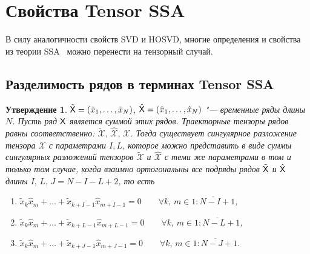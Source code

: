 \documentclass[specialist,
    substylefile = spbu_report.rtx,
    subf,href,colorlinks=true, 12pt]{disser}
\theoremstyle{plain}
\newtheorem{statement}{Утверждение}[section]
\theoremstyle{definition}
\theoremstyle{remark}
\begin{document}
    \section{Свойства Tensor SSA}\label{sec:Tensor SSA-properties}
    В силу аналогичности свойств SVD и HOSVD, многие определения и свойства из теории SSA~\cite{ssa} можно перенести на тензорный случай.

    \subsection{Разделимость рядов в терминах Tensor SSA}\label{subsec:tensor-ssa-separability}
    \begin{statement}
        \label{state:separability}
        $\tilde{\mathsf{X}}=(\tilde{x}_1,\ldots , \tilde{x}_N)$, $\hat{\mathsf{X}}=(\hat{x}_1,\ldots , \hat{x}_N)$ "--- временные ряды длины $N$.
        Пусть ряд $\mathsf{X}$ является суммой этих рядов.
        Траекторные тензоры рядов равны соответственно: $\tilde{\mathcal{X}},\, \hat{\mathcal{X}},\, \mathcal{X}$.
        Тогда существует сингулярное разложение тензора $\mathcal{X}$ с параметрами $I, L$, которое можно представить
        в виде суммы сингулярных разложений тензоров $\tilde{\mathcal{X}}$ и $\hat{\mathcal{X}}$ с теми же параметрами
        в том и только том случае, когда взаимно ортогональны все подряды рядов $\tilde{\mathsf{X}}$ и $\hat{\mathsf{X}}$
        длины $I,\, L,\, J=N-I-L+2$, то есть
        \begin{enumerate}
            \item $\tilde{x}_{k}\hat{x}_m + \ldots + \tilde{x}_{k+I-1} \hat{x}_{m+I-1}=0 \qquad \forall k,\, m\in\overline{1:N-I+1}$,
            \item $\tilde{x}_{k}\hat{x}_m + \ldots + \tilde{x}_{k+L-1} \hat{x}_{m+L-1}=0 \qquad \forall k,\, m\in\overline{1:N-L+1}$,
            \item $\tilde{x}_{k}\hat{x}_m + \ldots + \tilde{x}_{k+J-1} \hat{x}_{m+J-1}=0 \qquad \forall k,\, m\in\overline{1:N-J+1}$.
        \end{enumerate}
    \end{statement}
\end{document}
